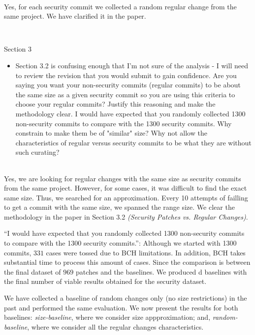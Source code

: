 \documentclass[11pt,fleqn]{article}
\newcommand{\eline}{\vspace*{.75\baselineskip}}
\newcommand{\Referee}[1]{\eline \noindent {\bf Reviewer comment #1:} \\}
\newcommand{\Us}{\eline \noindent {\bf Response:}\\}
\newenvironment{revcomment}[1][]
{\Referee{#1}\begin{rcomment}}
{\end{rcomment}}
\begin{document}
\Us Yes, for each security commit we collected a random regular change from the same project. We have clarified it 
in the paper. 

\begin{revcomment}[2.11]
    Section 3\\
    \begin{itemize}
        \item Section 3.2 is confusing enough that I'm not sure of the analysis - 
        I will need to review the revision that you would submit to gain confidence.  
        Are you saying you want your non-security commits (regular commits) to be about 
        the same size as a given security commit so you are using this criteria to choose 
        your regular commits?  Justify this reasoning and make the methodology clear.  
        I would have expected that you randomly collected 1300 non-security commits to compare 
        with the 1300 security commits. Why constrain to make them be of "similar" size?  
        Why not allow the characteristics of regular versus security commits to be what 
        they are without such curating?
    \end{itemize}
\end{revcomment}

\Us Yes, we are looking for regular changes with the same size as security commits
from the same project. However, 
for some cases, it was difficult to find the exact same size. Thus, we  
searched for an approximation. Every 10 attempts of failling to get a commit with 
the same size, we spanned the range size. We clear the methodology in the paper
in Section 3.2 \textit{(Security Patches vs. Regular Changes)}.

``I would have expected that you randomly collected 1300 non-security commits to compare 
with the 1300 security commits.'': Although we started with 1300 commits, 
$331$ cases were tossed due to BCH limitations. In addition, BCH
takes substantial time to process this amount of cases. 
Since the comparison is between 
the final dataset of $969$ patches and the baselines. We produced d
baselines with the final number of viable results obtained for the security 
dataset.

We 
have collected a baseline of random changes only (no size restrictions) in the past and 
performed the same evaluation. We now present the results for both baselines: \textit{size-baseline}, where we consider
size appproximation; and, \textit{random-baseline}, where we consider all the regular
changes characteristics.
\end{document}
